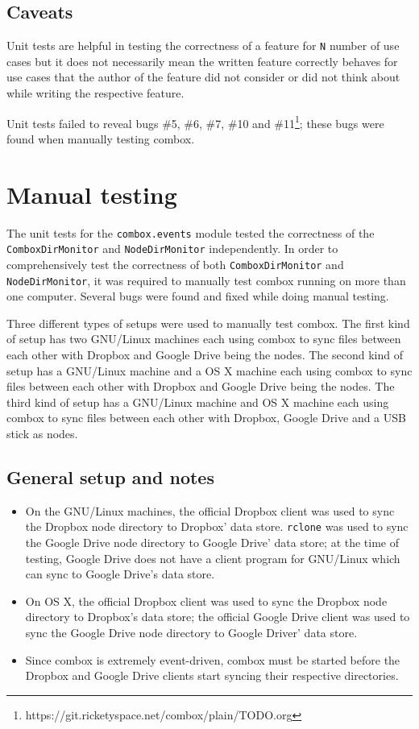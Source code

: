 \subsection{Caveats}

Unit tests are helpful in testing the correctness of a feature for
\verb+N+ number of use cases but it does not necessarily mean the
written feature correctly behaves for use cases that the author of the
feature did not consider or did not think about while writing the
respective feature.

Unit tests failed to reveal bugs \#5, \#6, \#7, \#10 and
\#11\footnote{https://git.ricketyspace.net/combox/plain/TODO.org};
these bugs were found when manually testing combox.

\section{Manual testing}\label{sec:4-manual-testing}

The unit tests for the \verb+combox.events+ module tested the
correctness of the \\ \verb+ComboxDirMonitor+ and \verb+NodeDirMonitor+
independently. In order to comprehensively test the correctness of
both \verb+ComboxDirMonitor+ and \verb+NodeDirMonitor+, it was
required to manually test combox running on more than one
computer. Several bugs were found and fixed while doing manual
testing.

Three different types of setups were used to manually test combox. The
first kind of setup has two GNU/Linux machines each using combox to
sync files between each other with Dropbox and Google Drive being the
nodes. The second kind of setup has a GNU/Linux machine and a OS X
machine each using combox to sync files between each other with
Dropbox and Google Drive being the nodes. The third kind of setup has
a GNU/Linux machine and OS X machine each using combox to sync files
between each other with Dropbox, Google Drive and a USB stick as
nodes.

\subsection{General setup and notes}

\begin{itemize}
\item On the GNU/Linux machines, the official Dropbox client was used
  to sync the Dropbox node directory to Dropbox' data
  store. \verb+rclone+\cite{program:rclone} was used to sync the
  Google Drive node directory to Google Drive' data store; at the time
  of testing, Google Drive does not have a client program for
  GNU/Linux which can sync to Google Drive's data store.
\item On OS X, the official Dropbox client was used to sync the
  Dropbox node directory to Dropbox's data store; the official Google
  Drive client was used to sync the Google Drive node directory to
  Google Driver' data store.
\item Since combox is extremely event-driven, combox must be started
  before the Dropbox and Google Drive clients start syncing their
  respective directories.
\end{itemize}

